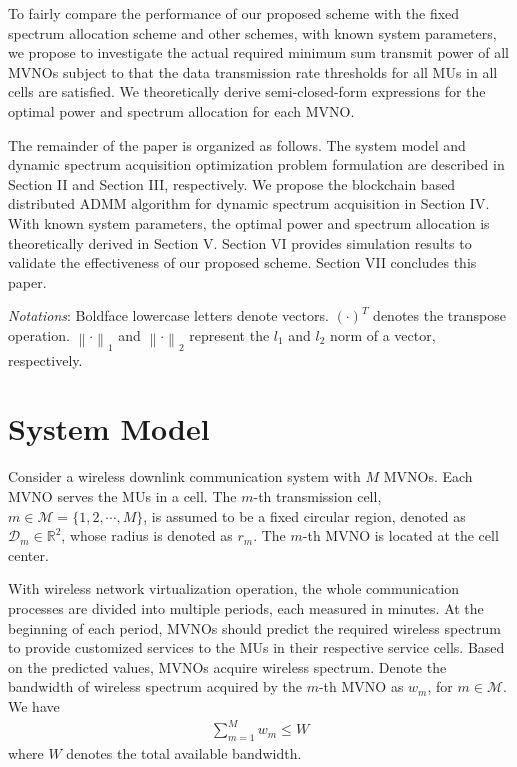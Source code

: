 \documentclass[journal]{IEEEtran}
\begin{document}
To fairly compare the performance of our proposed scheme with the fixed spectrum allocation scheme and other schemes, with known system parameters, we propose to investigate the actual required minimum sum transmit power of all MVNOs subject to that the data transmission rate thresholds for all MUs in all cells are satisfied. We theoretically derive semi-closed-form expressions for the optimal power and spectrum allocation for each MVNO.

The remainder of the paper is organized as follows. The system model and dynamic spectrum acquisition optimization problem formulation are described in Section II and Section III, respectively. We propose the blockchain based distributed ADMM algorithm for dynamic spectrum acquisition in Section IV. With known system parameters, the optimal power and spectrum allocation is theoretically derived in Section V. Section VI provides simulation results to validate the effectiveness of our proposed scheme. Section VII concludes this paper.

\emph{Notations}: Boldface lowercase letters denote vectors. $\left(\cdot\right)^T$ denotes the transpose operation. $\left\|\cdot \right\|_1$ and $\left\|\cdot \right\|_2$ represent the $l_1$ and $l_2$ norm of a vector, respectively.

\section{System Model}

Consider a wireless downlink communication system with $M$ MVNOs. Each MVNO serves the MUs in a cell. The $m$-th transmission cell, $m\in\mathcal{M}=\{1,2,\cdots,M\}$, is assumed to be a fixed circular region, denoted as  $\mathcal{D}_m\in \mathbb{R}^2$, whose radius is denoted as $r_m$. The $m$-th MVNO is located at the cell center.

With wireless network virtualization operation, the whole communication processes are divided into multiple periods, each measured in minutes. At the beginning of each period, MVNOs should predict the required wireless spectrum to provide customized services to the MUs in their respective service cells. Based on the predicted values, MVNOs acquire wireless spectrum. Denote the bandwidth of wireless spectrum acquired by the $m$-th MVNO as $w_m$, for $m\in\mathcal{M}$. We have
\begin{align}\label{q1}
\sum_{m=1}^{M} w_m \leq W
\end{align}
where $W$ denotes the total available bandwidth.
\end{document}
